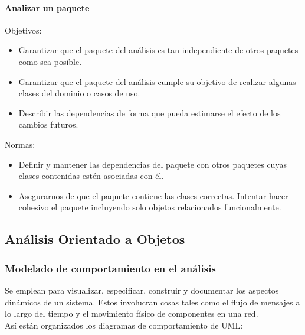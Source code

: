 \paragraph{Analizar un paquete}
Objetivos:
\begin{itemize}
\item Garantizar que el paquete del análisis es tan independiente de otros paquetes como sea posible.
\item Garantizar que el paquete del análisis cumple su objetivo de realizar algunas clases del dominio o casos de uso.
\item Describir las dependencias de forma que pueda estimarse el efecto de los cambios futuros.
\end{itemize}
Normas:
\begin{itemize}
\item Definir y mantener las dependencias del paquete con otros paquetes cuyas clases contenidas estén asociadas con él.
\item Asegurarnos de que el paquete contiene las clases correctas. Intentar hacer cohesivo el paquete incluyendo solo objetos relacionados funcionalmente.
\end{itemize}
\subsection{Análisis Orientado a Objetos}
\subsubsection{Modelado de comportamiento en el análisis}
Se emplean para visualizar, especificar, construir y documentar los aspectos dinámicos de un sistema. Estos involucran cosas tales como el flujo de mensajes a lo largo del tiempo y el movimiento físico de componentes en una red.\\
Así están organizados los diagramas de comportamiento de UML:
\begin{comment}
\begin{description}
\item[Diagramas de caso de uso] Organiza los comportamientos del sistema.
\item[Diagramas de secuencia] Centrados en la ordenación temporal de los mensajes.
\item[Diagramas de comunicación] Centrados en la organización estructural de los objetos que envían y reciben mensajes.
\item[Diagramas de estados] Centrados en el estado cambiante de un sistema dirigido por eventos.
\item[Diagramas de actividades] Centrados en el flujo de control de actividades.
\end{description}
\end{comment}

